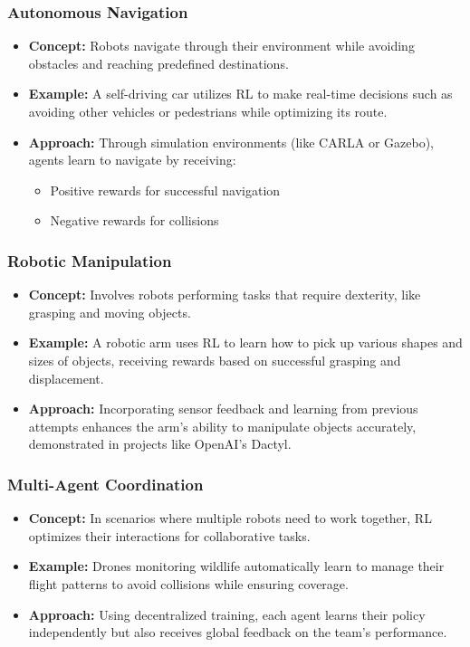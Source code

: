 \documentclass[aspectratio=169]{beamer}
\begin{document}
\begin{frame}[fragile]
    \frametitle{Autonomous Navigation}
    \begin{itemize}
        \item \textbf{Concept:} Robots navigate through their environment while avoiding obstacles and reaching predefined destinations.
        \item \textbf{Example:} A self-driving car utilizes RL to make real-time decisions such as avoiding other vehicles or pedestrians while optimizing its route.
        \item \textbf{Approach:} Through simulation environments (like CARLA or Gazebo), agents learn to navigate by receiving:
        \begin{itemize}
            \item Positive rewards for successful navigation
            \item Negative rewards for collisions
        \end{itemize}
    \end{itemize}
\end{frame}

\begin{frame}[fragile]
    \frametitle{Robotic Manipulation}
    \begin{itemize}
        \item \textbf{Concept:} Involves robots performing tasks that require dexterity, like grasping and moving objects.
        \item \textbf{Example:} A robotic arm uses RL to learn how to pick up various shapes and sizes of objects, receiving rewards based on successful grasping and displacement.
        \item \textbf{Approach:} Incorporating sensor feedback and learning from previous attempts enhances the arm's ability to manipulate objects accurately, demonstrated in projects like OpenAI's Dactyl.
    \end{itemize}
\end{frame}

\begin{frame}[fragile]
    \frametitle{Multi-Agent Coordination}
    \begin{itemize}
        \item \textbf{Concept:} In scenarios where multiple robots need to work together, RL optimizes their interactions for collaborative tasks.
        \item \textbf{Example:} Drones monitoring wildlife automatically learn to manage their flight patterns to avoid collisions while ensuring coverage.
        \item \textbf{Approach:} Using decentralized training, each agent learns their policy independently but also receives global feedback on the team's performance.
    \end{itemize}
\end{frame}
\end{document}
